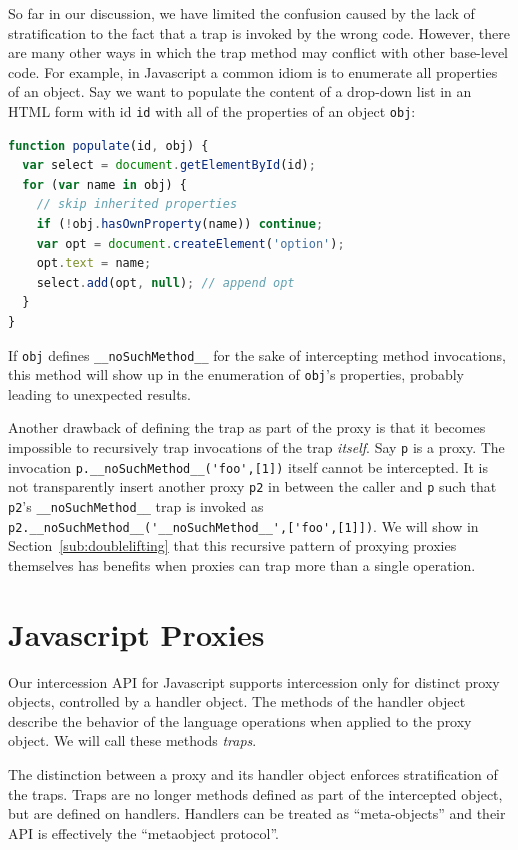 \documentclass{acm_proc_article-sp}
\newcommand{\noSuchMethod}{\texttt{\_\_noSuchMethod\_\_}}
\begin{document}
So far in our discussion, we have limited the confusion caused by the lack of stratification to the fact that a trap is invoked by the wrong code. However, there are many other ways in which the trap method may conflict with other base-level code. For example, in Javascript a common idiom is to enumerate all properties of an object. Say we want to populate the content of a drop-down list in an HTML form with id \texttt{id} with all of the properties of an object \texttt{obj}:

\begin{lstlisting}[language=javascript]
function populate(id, obj) {
  var select = document.getElementById(id);
  for (var name in obj) {
    // skip inherited properties
    if (!obj.hasOwnProperty(name)) continue;
    var opt = document.createElement('option');
    opt.text = name;
    select.add(opt, null); // append opt
  }
}
\end{lstlisting}

If \texttt{obj} defines \noSuchMethod{} for the sake of intercepting method invocations, this method will show up in the enumeration of \texttt{obj}'s properties, probably leading to unexpected results.

Another drawback of defining the trap as part of the proxy is that it becomes impossible to recursively trap invocations of the trap \emph{itself}. Say \texttt{p} is a proxy. The invocation \lstinline{p.__noSuchMethod__('foo',[1])} itself cannot be intercepted. It is not transparently insert another proxy \texttt{p2} in between the caller and \texttt{p} such that \texttt{p2}'s \noSuchMethod{} trap is invoked as \lstinline{p2.__noSuchMethod__('__noSuchMethod__',['foo',[1]])}. We will show in Section~\ref{sub:doublelifting} that this recursive pattern of proxying proxies themselves has benefits when proxies can trap more than a single operation.

\section{Javascript Proxies}
\label{sec:proxies_for_javascript}

Our intercession API for Javascript supports intercession only for distinct proxy objects, controlled by a handler object. The methods of the handler object describe the behavior of the language operations when applied to the proxy object. We will call these methods \emph{traps}.

The distinction between a proxy and its handler object enforces stratification of the traps. Traps are no longer methods defined as part of the intercepted object, but are defined on handlers. Handlers can be treated as ``meta-objects'' and their API is effectively the ``metaobject protocol''.
\end{document}
